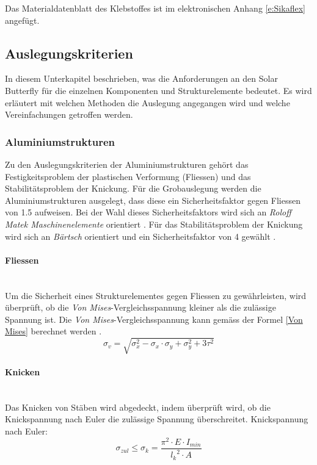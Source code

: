 Das Materialdatenblatt des Klebstoffes ist im elektronischen Anhang \ref{e:Sikaflex} angefügt.
\newpage

\subsection{Auslegungskriterien}
In diesem Unterkapitel beschrieben, was die Anforderungen an den Solar Butterfly für die einzelnen Komponenten und Strukturelemente bedeutet. Es wird erläutert mit welchen Methoden die Auslegung angegangen wird und welche Vereinfachungen getroffen werden.

  \subsubsection{Aluminiumstrukturen}
  Zu den Auslegungskriterien der Aluminiumstrukturen gehört das Festigkeitsproblem der plastischen Verformung (Fliessen) und das Stabilitätsproblem der Knickung. Für die Grobauslegung werden die Aluminiumstrukturen ausgelegt, dass diese ein Sicherheitsfaktor gegen Fliessen von 1.5 aufweisen. Bei der Wahl dieses Sicherheitsfaktors wird sich an \emph{Roloff Matek Maschinenelemente} orientiert \cite{Roloff}. Für das Stabilitätsproblem der Knickung wird sich an \emph{Bärtsch} orientiert und ein Sicherheitsfaktor von 4 gewählt \cite{Baertsch}.

  \paragraph{Fliessen}\mbox{}\\
  Um die Sicherheit eines Strukturelementes gegen Fliessen zu gewährleisten, wird überprüft, ob die \emph{Von Mises}-Vergleichsspannung kleiner als die zulässige Spannung ist. Die \emph{Von Mises}-Vergleichsspannung kann gemäss der Formel \ref{Von Mises} berechnet werden \cite{Baertsch}.
  \begin{equation}
    \label{Von Mises}
    \sigma_v = \sqrt{\sigma_x^{2}-\sigma_x \cdot \sigma_y + \sigma_y^2 + 3\tau^2}
  \end{equation}

  \paragraph{Knicken}\mbox{}\\
  Das Knicken von Stäben wird abgedeckt, indem überprüft wird, ob die Knickspannung nach Euler die zulässige Spannung überschreitet. Knickspannung nach Euler:
  \begin{equation}
    \sigma_{zul} \leq \sigma_k = \frac{\pi^2 \cdot E \cdot I_{min}}{{l_k}^2 \cdot A}
  \end{equation}

